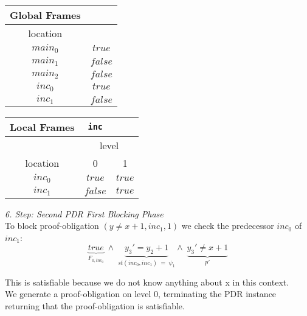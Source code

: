 \documentclass{article}
\newcommand\mycom[1]{}
\newcommand\mycom[1]{#1}
\newcommand{\jw}[1]{\mycom{\todo[color=blue!40,inline]{\small JW: #1}}}
\begin{document}
		\begin{minipage}{.5\textwidth}
		\setlength\tabcolsep{0.35em}
		\begin{center}
			\begin{tabu}{cc}
				Global Frames \\
				\toprule
				location & \\
				$main_0$ & $true$ \\
				$main_1$ & $false$ \\
				$main_2$ & $false$ \\
				$inc_0$ & $true$ \\
				$inc_1$ & $false$\\
				\bottomrule
			\end{tabu}
		\end{center}
	\end{minipage}
	\hfill
	\begin{minipage}{.4\textwidth}
		\setlength\tabcolsep{0.35em}
		\begin{center}
			\begin{tabu}{ccc}
				Local Frames & \texttt{inc} \\
				\toprule
				& \multicolumn{2}{c}{level} \\
				\cmidrule(lr){2-3}
				location & 0 & 1 \\
				\cmidrule{1-3}
				$inc_0$ & $true$ & $true$ \\
				$inc_1$ & $false$ & $true$ \\
				\bottomrule
			\end{tabu}
		\end{center}	
	\end{minipage}
	
	\vspace*{1em}
	
	
	\textsl{6. Step: Second PDR First Blocking Phase} \\
	To block proof-obligation $(y \neq x + 1, inc_1, 1)$ we check the predecessor $inc_0$ of $inc_1$: \\
		\begin{equation*}
		\underbrace{true}_{F_{0, inc_0}}\; \land \; \underbrace{y_3' = y_2 + 1}_{st(inc_0, inc_1)\; = \; \psi_1} \land \; \underbrace{y_3' \neq x + 1}_{p'}
		\end{equation*}
		\jw{In dem fall dass eine variable weder in In oder Out vorkommt ist sie Aux, oder einfach eine freie Variable? Hier x}
		This is satisfiable because we do not know anything about x in this context. \\
		We generate a proof-obligation on level 0, terminating the PDR instance returning that the proof-obligation is satisfiable. \\ \\
	
\end{document}
